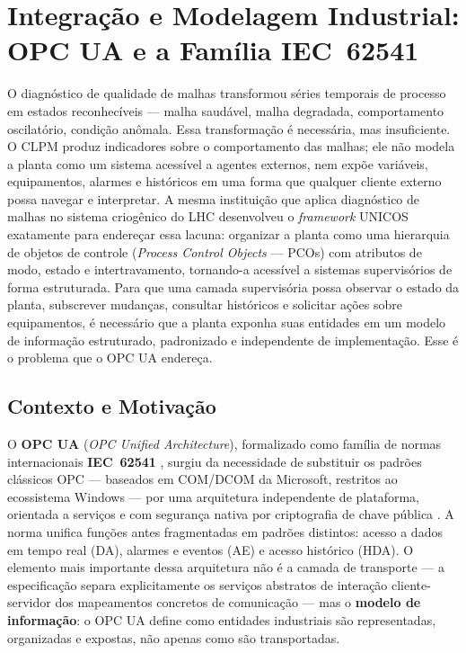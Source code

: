 \section{Integração e Modelagem Industrial: OPC UA e a Família IEC~62541}
\label{sec:opcua}

O diagnóstico de qualidade de malhas transformou séries temporais de processo em estados reconhecíveis --- malha saudável, malha degradada, comportamento oscilatório, condição anômala. Essa transformação é necessária, mas insuficiente. O CLPM produz indicadores sobre o comportamento das malhas; ele não modela a planta como um sistema acessível a agentes externos, nem expõe variáveis, equipamentos, alarmes e históricos em uma forma que qualquer cliente externo possa navegar e interpretar. A mesma instituição que aplica diagnóstico de malhas no sistema criogênico do LHC desenvolveu o \textit{framework} UNICOS \cite{Gayet2004} exatamente para endereçar essa lacuna: organizar a planta como uma hierarquia de objetos de controle (\textit{Process Control Objects} --- PCOs) com atributos de modo, estado e intertravamento, tornando-a acessível a sistemas supervisórios de forma estruturada. Para que uma camada supervisória possa observar o estado da planta, subscrever mudanças, consultar históricos e solicitar ações sobre equipamentos, é necessário que a planta exponha suas entidades em um modelo de informação estruturado, padronizado e independente de implementação. Esse é o problema que o OPC UA endereça.

\subsection{Contexto e Motivação}

O \textbf{OPC UA} (\textit{OPC Unified Architecture}), formalizado como família de normas internacionais \textbf{IEC~62541} \cite{IEC62541_1}, surgiu da necessidade de substituir os padrões clássicos OPC --- baseados em COM/DCOM da Microsoft, restritos ao ecossistema Windows --- por uma arquitetura independente de plataforma, orientada a serviços e com segurança nativa por criptografia de chave pública \cite{Mahnke2009intro}. A norma unifica funções antes fragmentadas em padrões distintos: acesso a dados em tempo real (DA), alarmes e eventos (AE) e acesso histórico (HDA). O elemento mais importante dessa arquitetura não é a camada de transporte --- a especificação separa explicitamente os serviços abstratos de interação cliente-servidor dos mapeamentos concretos de comunicação \cite{Mahnke2009services} --- mas o \textbf{modelo de informação}: o OPC UA define como entidades industriais são representadas, organizadas e expostas, não apenas como são transportadas.

